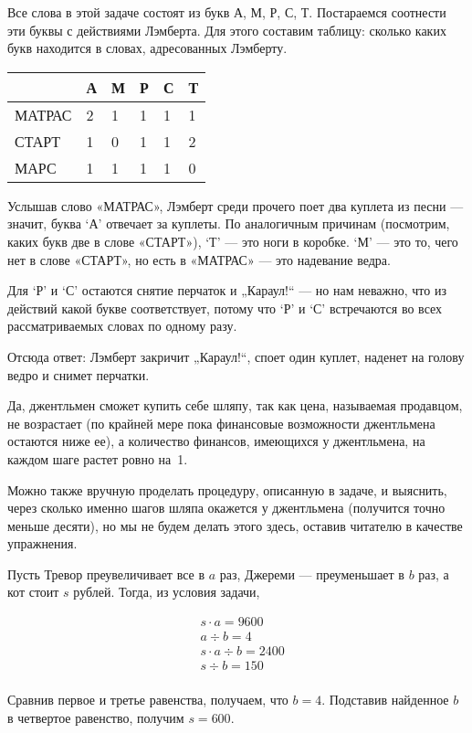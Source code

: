 ﻿

\begin{itemize}
\itA Все слова в этой задаче состоят из букв А, М, Р, С, Т. Постараемся соотнести эти буквы с действиями Лэмберта. Для этого составим таблицу: сколько каких букв находится в словах, адресованных Лэмберту.

\begin{center} \begin{tabular}{|l|l|l|l|l|l|}
\hline		& А & М & Р & С & Т \\ \hline
\ttfamily МАТРАС & 2 & 1 & 1 & 1 & 1 \\ \hline
\ttfamily СТАРТ & 1 & 0 & 1 & 1 & 2 \\ \hline
\ttfamily МАРС & 1 & 1 & 1 & 1 & 0 \\ \hline
\end{tabular} \end{center}

Услышав слово {\ttfamily «МАТРАС»}, Лэмберт среди прочего поет два куплета из песни — значит, буква `А' отвечает за куплеты. По аналогичным причинам (посмотрим, каких букв две в слове {\ttfamily «СТАРТ»}), `Т' — это ноги в коробке. `М' — это то, чего нет в слове {\ttfamily «СТАРТ»}, но есть в {\ttfamily «МАТРАС»} — это надевание ведра.

Для `Р' и `С' остаются снятие перчаток и „Караул!“ — но нам неважно, что из действий какой букве соответствует, потому что `Р' и `С' встречаются во всех рассматриваемых словах по одному разу.

Отсюда ответ: Лэмберт закричит „Караул!“, споет один куплет, наденет на голову ведро и снимет перчатки.

\itB Да, джентльмен сможет купить себе шляпу, так как цена, называемая продавцом, не возрастает (по крайней мере пока финансовые возможности джентльмена остаются ниже ее), а количество финансов, имеющихся у джентльмена, на каждом шаге растет ровно на~1.

Можно также вручную проделать процедуру, описанную в задаче, и выяснить, через сколько именно шагов шляпа окажется у джентльмена (получится точно меньше десяти), но мы не будем делать этого здесь, оставив читателю в качестве упражнения.

\itC Пусть Тревор преувеличивает все в $a$ раз, Джереми — преуменьшает в $b$ раз, а кот стоит $s$ рублей. Тогда, из условия задачи,

\begin{align*}
	& s \cdot a = 9600 \\
	& a \div b = 4 \\
	& s \cdot a \div b = 2400 \\
	& s \div b = 150 \\
\end{align*}

\vspace{-0.4cm}
Сравнив первое и третье равенства, получаем, что $b=4$. Подставив найденное $b$ в четвертое равенство, получим $s=600$.

\end{itemize}